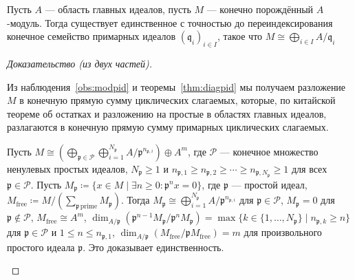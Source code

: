 \documentclass[
	extrafontsizes,
	11pt,
	hyphens,
]{memoir}
\begin{document}
\begin{theorem}
Пусть \(A\) --- область главных идеалов, пусть \(M\) --- конечно порождённый \(A\)-модуль. Тогда существует единственное с точностью до переиндексирования конечное семейство примарных идеалов \((\mathfrak{q}_i)_{i \in I}\), такое что \(M \cong \bigoplus_{i \in I} A / \mathfrak{q}_i\)
\end{theorem}

\begin{proof}[Доказательство (из двух частей)]
~\begin{proofdescription}

\item[Доказательство существования.]
Из наблюдения~\ref{obs:modpid} и теоремы~\ref{thm:diagpid} мы получаем разложение \(M\) в конечную прямую сумму циклических слагаемых, которые, по китайской теореме об остатках и разложению на простые в областях главных идеалов, разлагаются в конечную прямую сумму примарных циклических слагаемых.

\item[Доказательство единственности.]
Пусть
\(
M \cong (\bigoplus_{\mathfrak{p} \in \mathcal{P}} \bigoplus_{i = 1}^{N_\mathfrak{p}} A/{\mathfrak{p}}^{n_{\mathfrak{p},i}}) \oplus A^m
\),
где \(\mathcal{P}\) --- конечное множество ненулевых простых идеалов,
\(N_\mathfrak{p} \geq 1\) и \(n_{\mathfrak{p},1} \geq n_{\mathfrak{p},2} \geq \cdots \geq n_{\mathfrak{p},N_\mathfrak{p}} \geq 1\) для всех \(\mathfrak{p} \in \mathcal{P}\).
Пусть \(M_\mathfrak{p} \coloneqq \{x \in M \mid \exists n \geq 0 : \mathfrak{p}^n x = 0\}\), где \(\mathfrak{p}\) --- простой идеал, \(M_\mathrm{free} \coloneqq M / (\sum_{\mathfrak{p}\, \text{prime}} M_\mathfrak{p})\).
Тогда \(M_\mathfrak{p} \cong \bigoplus_{i = 1}^{N_\mathfrak{p}} A/\mathfrak{p}^{n_{\mathfrak{p},i}}\) для \(\mathfrak{p} \in \mathcal{P}\), \(M_\mathfrak{p} = 0\) для \(\mathfrak{p} \notin \mathcal{P}\), \(M_\mathrm{free} \cong A^m\), \(\dim_{A/\mathfrak{p}}(\mathfrak{p}^{n-1}M_\mathfrak{p} / \mathfrak{p}^n M_\mathfrak{p}) = \max\{k \in \{1,\dots{},N_\mathfrak{p}\} \mid n_{\mathfrak{p},k} \geq n\}\) для \(\mathfrak{p} \in \mathcal{P}\) и \(1 \leq n \leq n_{\mathfrak{p},1}\), \(\dim_{A/\mathfrak{p}}(M_\mathrm{free}/\mathfrak{p}M_\mathrm{free}) = m\) для произвольного простого идеала \(\mathfrak{p}\). Это доказывает единственность.
\qedhere

\end{proofdescription}
\end{proof}
\end{document}

